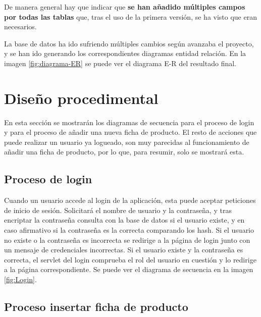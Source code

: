 De manera general hay que indicar que \textbf{se han añadido múltiples campos por todas las tablas} que, tras el uso de la primera versión, se ha visto que eran necesarios.

La base de datos ha ido sufriendo múltiples cambios según avanzaba el proyecto, y se han ido generando los correspondientes diagramas entidad relación. En la imagen \ref{fig:diagrama-ER} se puede ver el diagrama E-R del resultado final.


\section{Diseño procedimental}

En esta sección se mostrarán los diagramas de secuencia para el proceso de login y para el proceso de añadir una nueva ficha de producto. El resto de acciones que puede realizar un usuario ya logueado, son muy  parecidas al funcionamiento de añadir una ficha de producto, por lo que, para resumir, solo se mostrará esta. 

\subsection{Proceso de login}

Cuando un usuario accede al login de la aplicación, esta puede aceptar peticiones de inicio de sesión. Solicitará el nombre de usuario y la contraseña, y tras encriptar la contraseña consulta con la base de datos si el usuario existe, y en caso afirmativo si la contraseña es la correcta comparando los hash. Si el usuario no existe o la contraseña es incorrecta se redirige a la página de login junto con un mensaje de credenciales incorrectas. Si el usuario existe y la contraseña es correcta, el servlet del login comprueba el rol del usuario en cuestión y lo redirige a la página correspondiente. Se puede ver el diagrama  de secuencia en la imagen \ref{fig:Login}.



\subsection{Proceso insertar ficha de producto}

